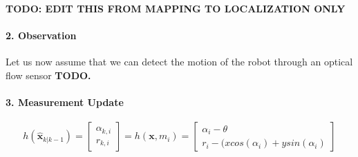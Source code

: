 \textbf{TODO: EDIT THIS FROM MAPPING TO LOCALIZATION ONLY}
\paragraph{2. Observation}
Let us now assume that we can detect the motion of the robot through an optical flow sensor \textbf{TODO.}

\paragraph{3. Measurement Update}

\begin{equation} h(\hat{\boldsymbol{x}}_{k|k-1})=\left[\begin{array}{c}\alpha_{k,i}\\r_{k,i}\end{array}\right]=h(\boldsymbol{x},m_i)=\left[\begin{array}{c}\alpha_i-\theta\\r_i-(x cos(\alpha_i)+y sin(\alpha_i)\end{array}\right]
\end{equation}

